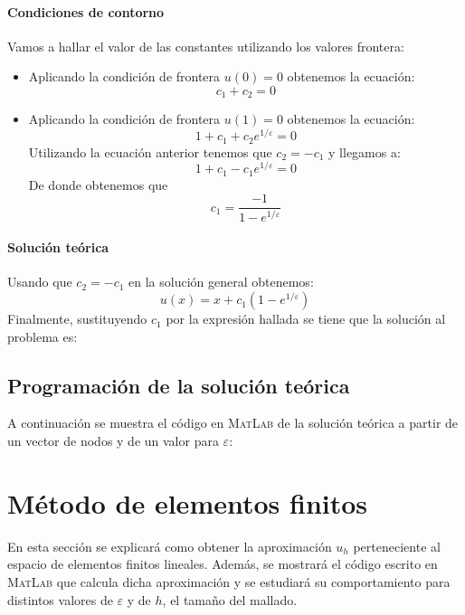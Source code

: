 \documentclass[spanish]{mathnotes}
\begin{document}
	\paragraph{Condiciones de contorno} Vamos a hallar el valor de las constantes utilizando los valores frontera:
	\begin{itemize}
		\item Aplicando la condición de frontera $u(0)=0$ obtenemos la ecuación:
		$$c_1+c_2 = 0$$
		\item Aplicando la condición de frontera
		$u(1)=0$ obtenemos la ecuación:
		$$1+c_1+c_2e^{1/\varepsilon} = 0$$
		Utilizando la ecuación anterior tenemos que $c_2=-c_1$ y llegamos a:
		$$1+c_1-c_1e^{1/\varepsilon}=0$$
		De donde obtenemos que
		$$c_1 = \frac{-1}{1-e^{1/\varepsilon}}$$
	\end{itemize}
	\paragraph{Solución teórica} Usando que $c_2=-c_1$ en la solución general obtenemos:
	$$u(x) = x+c_1(1-e^{1/\varepsilon})$$
	Finalmente, sustituyendo $c_1$ por la expresión hallada se tiene que la solución al problema es:
	\begin{center}
	{\large
	}
	\end{center}
	\subsection{Programación de la solución teórica}
	A continuación se muestra el código en \textsc{MatLab} de la solución teórica a partir de un vector de nodos y de un valor para $\varepsilon$:
	\lstset{style=matlabStyle}
	
	
	
	
	\newpage
	\section{Método de elementos finitos}
	En esta sección se explicará como obtener la aproximación $u_h$ perteneciente al espacio de elementos finitos lineales. Además, se mostrará el código escrito en \textsc{MatLab} que calcula dicha aproximación y se estudiará su comportamiento para distintos valores de $\varepsilon$ y de $h$, el tamaño del mallado.
	
\end{document}
